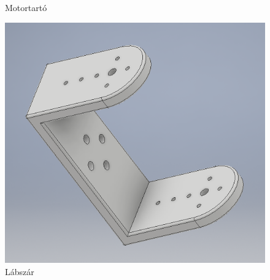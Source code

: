 \documentclass{article}
\begin{document}
\begin{figure}[h]
\begin{minipage}{0.3\textwidth}
		\caption{Motortartó}
	\end{minipage}\hfill
	\begin{minipage}{0.3\textwidth}
		\centering
		\includegraphics[width=\textwidth]{labszar}
		\caption{Lábszár}
	\end{minipage}
\end{figure}
\end{document}
